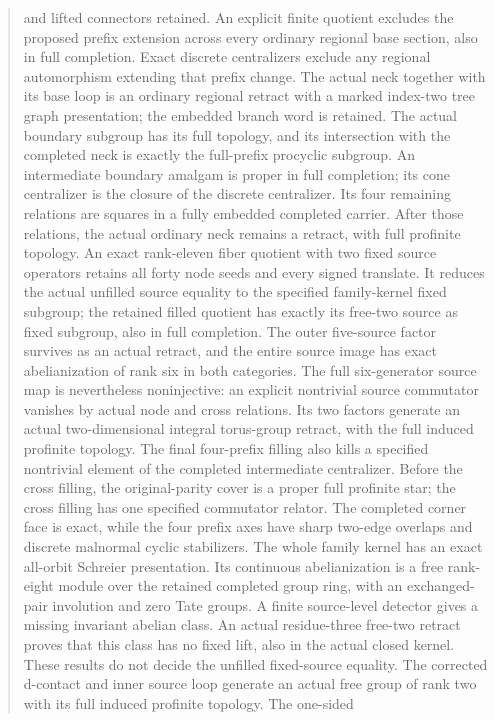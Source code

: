 \documentclass[11pt,a4paper]{article}
\begin{document}
\begin{abstract}
and lifted connectors retained. An explicit finite quotient excludes the proposed prefix extension
across every ordinary regional base section, also in full completion.
Exact discrete centralizers exclude any regional automorphism extending
that prefix change. The actual neck together with its base loop is an
ordinary regional retract with a marked index-two tree graph presentation;
the embedded branch word is retained. The actual boundary subgroup
has its full topology, and its intersection with the completed neck is
exactly the full-prefix procyclic subgroup. An intermediate boundary
amalgam is proper in full completion; its cone centralizer is the closure
of the discrete centralizer. Its four remaining relations are squares
in a fully embedded completed carrier. After those relations, the actual
ordinary neck remains a retract, with full profinite topology. An exact
rank-eleven fiber quotient with two fixed source operators retains all
forty node seeds and every signed translate. It reduces the actual
unfilled source equality to the specified family-kernel fixed subgroup;
the retained filled quotient has exactly its free-two source as fixed
subgroup, also in full completion. The outer five-source factor survives
as an actual retract, and the entire source image has exact abelianization
of rank six in both categories. The full six-generator source map is
nevertheless noninjective: an explicit nontrivial source commutator
vanishes by actual node and cross relations. Its two factors generate
an actual two-dimensional integral torus-group retract, with the full
induced profinite topology. The final four-prefix filling also kills a
specified nontrivial element of the completed intermediate centralizer.
Before the cross filling, the original-parity cover is a proper full
profinite star; the cross filling has one specified commutator relator.
The completed corner face is exact, while the four prefix axes have
sharp two-edge overlaps and discrete malnormal cyclic stabilizers.
The whole family kernel has an exact all-orbit Schreier presentation.
Its continuous abelianization is a free rank-eight module over the
retained completed group ring, with an exchanged-pair involution and
zero Tate groups. A finite source-level detector gives a missing
invariant abelian class. An actual residue-three free-two retract
proves that this class has no fixed lift, also in the actual closed
kernel. These results do not decide the unfilled fixed-source equality.
The corrected d-contact and inner source loop generate an actual free
group of rank two with its full induced profinite topology. The one-sided

\end{abstract}
\end{document}

